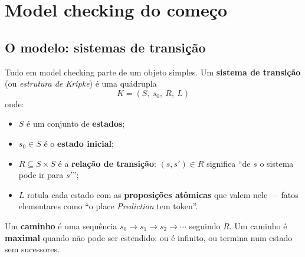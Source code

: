 \documentclass[11pt,a4paper]{report}
\begin{document}
\chapter{Model checking do começo}
\label{cap:mc}

\section{O modelo: sistemas de transição}

Tudo em model checking parte de um objeto simples. Um \textbf{sistema de
transição} (ou \emph{estrutura de Kripke}) é uma quádrupla
\[
  K = (S,\ s_0,\ R,\ L)
\]
onde:

\begin{itemize}
  \item $S$ é um conjunto de \textbf{estados};
  \item $s_0 \in S$ é o \textbf{estado inicial};
  \item $R \subseteq S \times S$ é a \textbf{relação de transição}: $(s,s')
        \in R$ significa ``de $s$ o sistema pode ir para $s'$'';
  \item $L$ rotula cada estado com as \textbf{proposições atômicas} que valem
        nele --- fatos elementares como ``o place \emph{Prediction} tem token''.
\end{itemize}

Um \textbf{caminho} é uma sequência $s_0 \to s_1 \to s_2 \to \cdots$ seguindo
$R$. Um caminho é \textbf{maximal} quando não pode ser estendido: ou é
infinito, ou termina num estado sem sucessores.

\begin{center}
\end{center}
\end{document}
